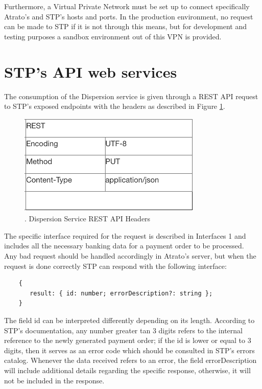 Furthermore, a Virtual Private Network must be set up to connect specifically Atrato’s and STP’s hosts and ports. In the production environment, no request can be made to STP if it is not through this means, but for development and testing purposes a sandbox environment out of this VPN is provided.

\section{STP’s API web services}

The consumption of the Dispersion service is given through a REST API request to STP’s exposed endpoints with the headers as described in Figure \ref{fig:STPRequestParams}.

\begin{figure} [h!]
    \centering
    \includegraphics[scale = 1]{assets/diagrams/STPRequestParams.png}
    \caption{. Dispersion Service REST API Headers}\label{fig:STPRequestParams}
\end{figure}

The specific interface required for the request is described in Interfaces 1 and includes all the necessary banking data for a payment order to be processed.\\

Any bad request should be handled accordingly in Atrato’s server, but when the request is done correctly STP can respond with the following interface:

\begin{verbatim}
    {
       result: { id: number; errorDescription?: string }; 
    }
\end{verbatim}
  
The field id can be interpreted differently depending on its length. According to STP’s documentation, any number greater tan 3 digits refers to the internal reference to the newly generated payment order; if the id is lower or equal to 3 digits, then it serves as an error code which should be consulted in STP’s errors catalog. Whenever the data received refers to an error, the field errorDescription will include additional details regarding the specific response, otherwise, it will not be included in the response.

